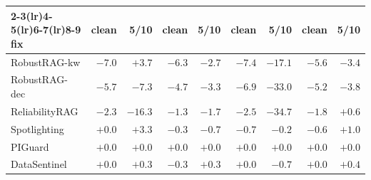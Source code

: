 \begin{table}[t]
\begin{tabular}{@{}lrrrrrrrr@{}}
\cmidrule(lr){2-3}\cmidrule(lr){4-5}\cmidrule(lr){6-7}\cmidrule(lr){8-9}
fix & clean & 5/10 & clean & 5/10 & clean & 5/10 & clean & 5/10 \\
\midrule
RobustRAG-kw & $-7.0$ & $+3.7$ & $-6.3$ & $-2.7$ & $-7.4$ & $-17.1$ & $-5.6$ & $-3.4$ \\
RobustRAG-dec & $-5.7$ & $-7.3$ & $-4.7$ & $-3.3$ & $-6.9$ & $-33.0$ & $-5.2$ & $-3.8$ \\
ReliabilityRAG & $-2.3$ & $-16.3$ & $-1.3$ & $-1.7$ & $-2.5$ & $-34.7$ & $-1.8$ & $+0.6$ \\
Spotlighting & $+0.0$ & $+3.3$ & $-0.3$ & $-0.7$ & $-0.7$ & $-0.2$ & $-0.6$ & $+1.0$ \\
PIGuard & $+0.0$ & $+0.0$ & $+0.0$ & $+0.0$ & $+0.0$ & $+0.0$ & $+0.0$ & $+0.0$ \\
DataSentinel & $+0.0$ & $+0.3$ & $-0.3$ & $+0.3$ & $+0.0$ & $-0.7$ & $+0.0$ & $+0.4$ \\
\bottomrule
\end{tabular}
\end{table}
